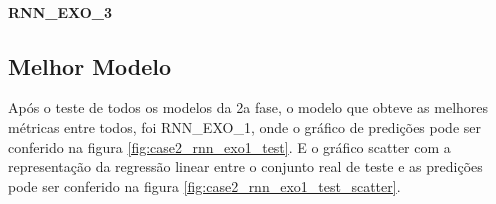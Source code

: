             \paragraph{RNN\_EXO\_3}
            {\begin{center} \begin{minipage}[c]{1.0\textwidth}
            \begin{figure}[H]
            \end{figure}
            \end{minipage} \hfill %
              \begin{minipage}[c]{0.45\textwidth}
            \begin{figure}[H]
                \end{figure}
                \end{minipage} \end{center} } 
    	  \subsection{Melhor Modelo}
    	    Após o teste de todos os modelos da 2a fase, o modelo que obteve as melhores métricas entre todos, foi RNN\_EXO\_1, onde o gráfico de predições pode ser conferido na figura \ref{fig:case2_rnn_exo1_test}. E o gráfico scatter com a representação da regressão linear entre o conjunto real de teste e as predições pode ser conferido na figura \ref{fig:case2_rnn_exo1_test_scatter}.
    	    
